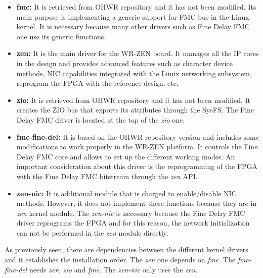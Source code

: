 \documentclass[review]{elsarticle}
\begin{document}
\begin{itemize}
	\item {\textbf{fmc:} It is retrieved from OHWR repository and it has not been modified. Its main purpose is implementing a generic support for FMC bus in the Linux kernel. It is necessary because many other drivers such as Fine Delay FMC one use its generic functions.}
	\item {\textbf{zen:} It is the main driver for the WR-ZEN board. It manages all the IP cores in the design and provides advanced features such as character device methods, NIC capabilities integrated with the Linux networking subsystem, reprogram the FPGA with the reference design, etc.}
	\item{\textbf{zio:} It is retrieved from OHWR repository and it has not been modified. It creates the ZIO bus that exports its attributes through the SysFS. The Fine Delay FMC driver is located at the top of the \textit{zio} one.}
	\item{\textbf{fmc-fine-del:} It is based on the OHWR repository version and includes some modifications to work properly in the WR-ZEN platform. It controls the Fine Delay FMC core and allows to set up the different working modes. An important consideration about this driver is the reprogramming of the FPGA with the Fine Delay FMC bitstream through the \textit{zen} API.}
	\item {\textbf{zen-nic:} It is additional module that is charged to enable/disable NIC methods. However, it does not implement these functions because they are in \textit{zen} kernel module. The \textit{zen-nic} is necessary because the Fine Delay FMC driver reprograms the FPGA and for this reason, the network initialization can not be performed in the \textit{zen} module directly.}
\end{itemize}

As previously seen, there are dependencies between the different kernel drivers and it establishes the installation order. The \textit{zen} one depends on \textit{fmc}. The \textit{fmc-fine-del} needs \textit{zen}, \textit{zio} and \textit{fmc}. The \textit{zen-nic} only uses the \textit{zen}.
\end{document}
